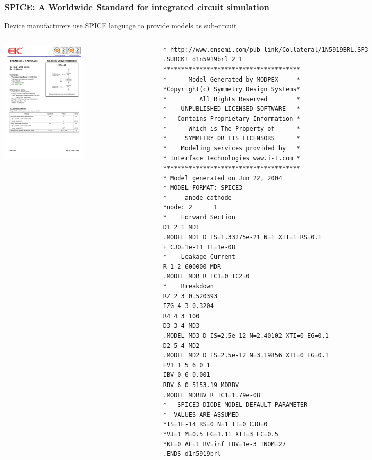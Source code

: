 \begin{frame}[fragile]
  \frametitle{SPICE: A Worldwide Standard for integrated circuit simulation}
  \centerline{Device manufacturers use SPICE language to provide models as sub-circuit}
  \begin{columns}
    \begin{column}{.5\textwidth}
      \begin{center}
        \includegraphics[height=6cm]{figures/1N5919B-1.pdf}
      \end{center}
    \end{column}
    \begin{column}{.5\textwidth}
      {\fontsize{4.25pt}{4.25pt}\selectfont
\begin{verbatim}
* http://www.onsemi.com/pub_link/Collateral/1N5919BRL.SP3
.SUBCKT d1n5919brl 2 1
**************************************
*      Model Generated by MODPEX     *
*Copyright(c) Symmetry Design Systems*
*         All Rights Reserved        *
*    UNPUBLISHED LICENSED SOFTWARE   *
*   Contains Proprietary Information *
*      Which is The Property of      *
*     SYMMETRY OR ITS LICENSORS      *
*    Modeling services provided by   *
* Interface Technologies www.i-t.com *
**************************************
* Model generated on Jun 22, 2004
* MODEL FORMAT: SPICE3
*     anode cathode
*node: 2      1
*    Forward Section
D1 2 1 MD1
.MODEL MD1 D IS=1.33275e-21 N=1 XTI=1 RS=0.1
+ CJO=1e-11 TT=1e-08
*    Leakage Current
R 1 2 600000 MDR
.MODEL MDR R TC1=0 TC2=0
*    Breakdown
RZ 2 3 0.520393
IZG 4 3 0.3204
R4 4 3 100
D3 3 4 MD3
.MODEL MD3 D IS=2.5e-12 N=2.40102 XTI=0 EG=0.1
D2 5 4 MD2
.MODEL MD2 D IS=2.5e-12 N=3.19856 XTI=0 EG=0.1
EV1 1 5 6 0 1
IBV 0 6 0.001
RBV 6 0 5153.19 MDRBV
.MODEL MDRBV R TC1=1.79e-08
*-- SPICE3 DIODE MODEL DEFAULT PARAMETER
*  VALUES ARE ASSUMED
*IS=1E-14 RS=0 N=1 TT=0 CJO=0
*VJ=1 M=0.5 EG=1.11 XTI=3 FC=0.5
*KF=0 AF=1 BV=inf IBV=1e-3 TNOM=27
.ENDS d1n5919brl
\end{verbatim}%
      }
    \end{column}
  \end{columns}
\end{frame}

